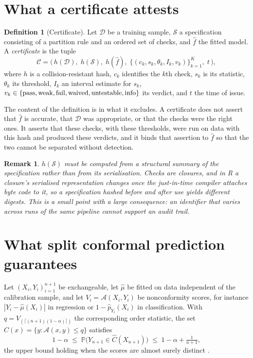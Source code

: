 \documentclass[11pt,a4paper]{article}
\newtheorem{remark}{Remark}
\theoremstyle{definition}
\newtheorem{definition}{Definition}
\begin{document}
\section{What a certificate attests}
\label{sec:certificate}

\begin{definition}[Certificate]
Let $\mathcal{D}$ be a training sample, $\mathcal{S}$ a specification
consisting of a partition rule and an ordered set of checks, and $\hat f$ the
fitted model. A \emph{certificate} is the tuple
\[
  \mathcal{C} = \bigl(\,h(\mathcal{D}),\; h(\mathcal{S}),\; h(\hat f),\;
  \{(c_k, s_k, \theta_k, I_k, v_k)\}_{k=1}^{K},\; t\,\bigr),
\]
where $h$ is a collision-resistant hash, $c_k$ identifies the $k$th check,
$s_k$ is its statistic, $\theta_k$ its threshold, $I_k$ an interval estimate
for $s_k$, $v_k \in \{\textup{pass},\textup{weak},\textup{fail},
\textup{waived},\textup{untestable},\textup{info}\}$ its verdict, and $t$ the
time of issue.
\end{definition}

The content of the definition is in what it excludes. A certificate does not
assert that $\hat f$ is accurate, that $\mathcal{D}$ was appropriate, or that
the checks were the right ones. It asserts that these checks, with these
thresholds, were run on data with this hash and produced these verdicts, and
it binds that assertion to $\hat f$ so that the two cannot be separated without
detection.

\begin{remark}
$h(\mathcal{S})$ must be computed from a structural summary of the
specification rather than from its serialisation. Checks are closures, and in
\textsf{R} a closure's serialised representation changes once the just-in-time
compiler attaches byte code to it, so a specification hashed before and after
use yields different digests. This is a small point with a large consequence:
an identifier that varies across runs of the same pipeline cannot support an
audit trail.
\end{remark}

\section{What split conformal prediction guarantees}
\label{sec:conformal}

Let $(X_i, Y_i)_{i=1}^{n+1}$ be exchangeable, let $\hat\mu$ be fitted on data
independent of the calibration sample, and let $V_i = \mathcal{A}(X_i, Y_i)$ be
nonconformity scores, for instance $|Y_i - \hat\mu(X_i)|$ in regression or
$1 - \hat p_{Y_i}(X_i)$ in classification. With
$q = V_{(\lceil (n+1)(1-\alpha)\rceil)}$ the corresponding order statistic, the
set $\hat C(x) = \{y : \mathcal{A}(x,y) \le q\}$ satisfies
\begin{equation}
  1 - \alpha \;\le\; \mathbb{P}\bigl(Y_{n+1} \in \hat C(X_{n+1})\bigr)
  \;\le\; 1 - \alpha + \tfrac{1}{n+1},
  \label{eq:split}
\end{equation}
the upper bound holding when the scores are almost surely distinct
\citep{vovk2005,lei2018}.
\end{document}

